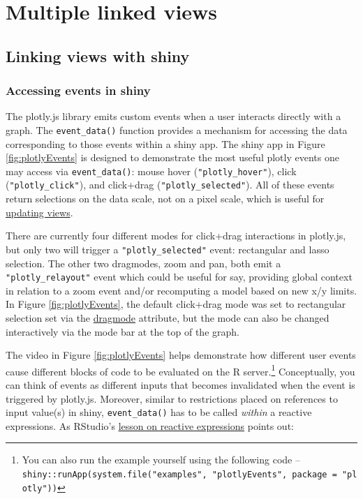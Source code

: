 \documentclass[12pt,]{isuthesis}
\let\rmarkdownfootnote\footnote%
\def\footnote{\protect\rmarkdownfootnote}
\begin{document}
\section{Multiple linked views}\label{multiple-linked-views-1}

\hypertarget{linking-views-with-shiny}{\subsection{Linking views with
shiny}\label{linking-views-with-shiny}}

\subsubsection{Accessing events in
shiny}\label{accessing-events-in-shiny}

The plotly.js library emits custom events when a user interacts directly
with a graph. The \texttt{event\_data()} function provides a mechanism
for accessing the data corresponding to those events within a shiny app.
The shiny app in Figure \ref{fig:plotlyEvents} is designed to
demonstrate the most useful plotly events one may access via
\texttt{event\_data()}: mouse hover (\texttt{"plotly\_hover"}), click
(\texttt{"plotly\_click"}), and click+drag
(\texttt{"plotly\_selected"}). All of these events return selections on
the data scale, not on a pixel scale, which is useful for
\protect\hyperlink{updating-views}{updating views}.

There are currently four different modes for click+drag interactions in
plotly.js, but only two will trigger a \texttt{"plotly\_selected"}
event: rectangular and lasso selection. The other two dragmodes, zoom
and pan, both emit a \texttt{"plotly\_relayout"} event which could be
useful for say, providing global context in relation to a zoom event
and/or recomputing a model based on new x/y limits. In Figure
\ref{fig:plotlyEvents}, the default click+drag mode was set to
rectangular selection set via the
\href{https://plot.ly/r/reference/\#layout-dragmode}{dragmode}
attribute, but the mode can also be changed interactively via the mode
bar at the top of the graph.

The video in Figure \ref{fig:plotlyEvents} helps demonstrate how
different user events cause different blocks of code to be evaluated on
the R server.\footnote{You can also run the example yourself using the
  following code --
  \texttt{shiny::runApp(system.file("examples",\ "plotlyEvents",\ package\ =\ "plotly"))}}
Conceptually, you can think of events as different inputs that becomes
invalidated when the event is triggered by plotly.js. Moreover, similar
to restrictions placed on references to input value(s) in shiny,
\texttt{event\_data()} has to be called \emph{within} a reactive
expressions. As RStudio's
\href{http://web.archive.org/web/20160405081516/http://shiny.rstudio.com/tutorial/lesson6/}{lesson
on reactive expressions} points out:
\end{document}
